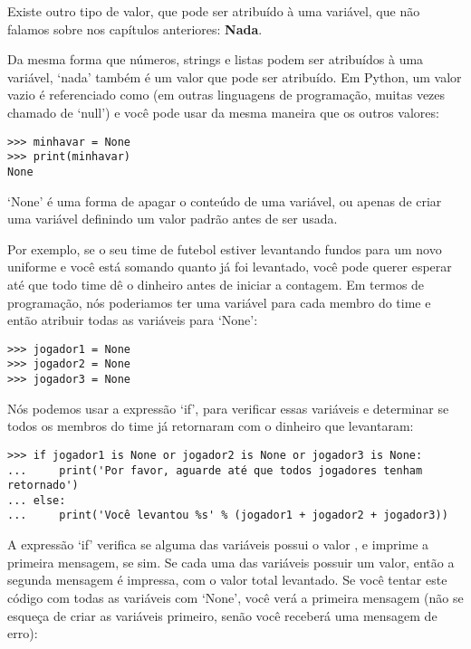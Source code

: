 Existe outro tipo de valor, que pode ser atribuído à uma variável, que não falamos sobre nos capítulos anteriores: \textbf{Nada}.
\par
Da mesma forma que números, strings e listas podem ser atribuídos à uma variável, `nada' também é um valor que pode ser atribuído. Em Python, um valor vazio é referenciado como  (em outras linguagens de programação, muitas vezes chamado de `null') e você pode usar da mesma maneira que os outros valores:

\begin{listing}
\begin{verbatim}
>>> minhavar = None
>>> print(minhavar)
None
\end{verbatim}
\end{listing}

`None' é uma forma de apagar o conteúdo de uma variável, ou apenas de criar uma variável definindo um valor padrão antes de ser usada.
\par
Por exemplo, se o seu time de futebol estiver levantando fundos para um novo uniforme e você está somando quanto já foi levantado, você pode querer esperar até que todo time dê o dinheiro antes de iniciar a contagem. Em termos de programação, nós poderiamos ter uma variável para cada membro do time e então atribuir todas as variáveis para `None':

\begin{listing}
\begin{verbatim}
>>> jogador1 = None
>>> jogador2 = None
>>> jogador3 = None
\end{verbatim}
\end{listing}

Nós podemos usar a expressão `if', para verificar essas variáveis e determinar se todos os membros do time já retornaram com o dinheiro que levantaram:

\begin{listing}
\begin{verbatim}
>>> if jogador1 is None or jogador2 is None or jogador3 is None:
...     print('Por favor, aguarde até que todos jogadores tenham retornado')
... else:
...     print('Você levantou %s' % (jogador1 + jogador2 + jogador3))
\end{verbatim}
\end{listing}

A expressão `if' verifica se alguma das variáveis possui o valor , e imprime a primeira mensagem, se sim. Se cada uma das variáveis possuir um valor, então a segunda mensagem é impressa, com o valor total levantado. Se você tentar este código com todas as variáveis com `None', você verá a primeira mensagem (não se esqueça de criar as variáveis primeiro, senão você receberá uma mensagem de erro):


